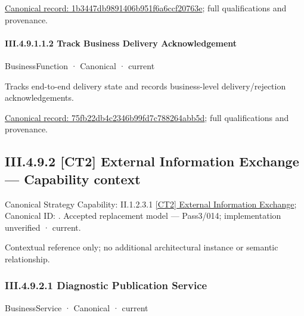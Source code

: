 {\footnotesize \href{../../../../../../../../continuum/business/business-service/1b3447db9891406b951f6a6ccf20763e.md}{Canonical record: 1b3447db9891406b951f6a6ccf20763e}; full qualifications and provenance.}\par
\paragraph*{III.4.9.1.1.2 Track Business Delivery Acknowledgement}
\label{navigation:III.4.9.1.1.2}

\label{element:75fb22db4c2346b99fd7c788264abb5d}
{\small BusinessFunction · Canonical · current}\par

Tracks end-to-end delivery state and records business-level delivery/rejection acknowledgements.


{\footnotesize \href{../../../../../../../../continuum/business/business-function/75fb22db4c2346b99fd7c788264abb5d.md}{Canonical record: 75fb22db4c2346b99fd7c788264abb5d}; full qualifications and provenance.}\par
\subsection*{III.4.9.2 [CT2] External Information Exchange — Capability context}
\label{navigation:III.4.9.2}

{\small Canonical Strategy Capability: II.1.2.3.1 \hyperref[element:883265005129434382aa86d2bcadb989]{[CT2] External Information Exchange}; Canonical ID: \texttt{}. Accepted replacement model — Pass3/014; implementation unverified · current.}\par
Contextual reference only; no additional architectural instance or semantic relationship.\par
\subsubsection*{III.4.9.2.1 Diagnostic Publication Service}
\label{navigation:III.4.9.2.1}

\label{element:600ca5384b4643b0b35579a02c307dcf}
{\small BusinessService · Canonical · current}\par

